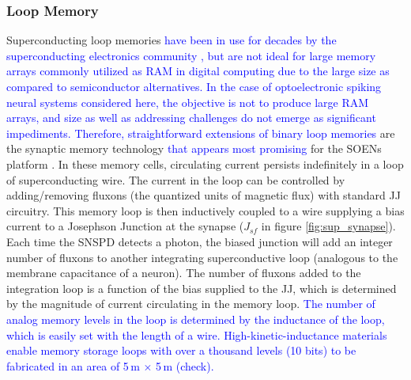 \documentclass[twocolumn]{article}
\begin{document}
\subsubsection{Loop Memory}\label{Loops}
Superconducting loop memories \textcolor{blue}{have been in use for decades by the superconducting electronics community \cite{vatu1998,ka1999}, but are not ideal for large memory arrays commonly utilized as RAM in digital computing due to the large size as compared to semiconductor alternatives. In the case of optoelectronic spiking neural systems considered here, the objective is not to produce large RAM arrays, and size as well as addressing challenges do not emerge as significant impediments. Therefore, straightforward extensions of binary loop memories} are the synaptic memory technology \textcolor{blue}{that appears most promising} for the SOENs platform \cite{sh2018,shainline2019superconducting}. In these memory cells, circulating current persists indefinitely in a loop of superconducting wire. The current in the loop can be controlled by adding/removing fluxons (the quantized units of magnetic flux) with standard JJ circuitry. This memory loop is then inductively coupled to a wire supplying a bias current to a Josephson Junction at the synapse ($J_{sf}$ in figure \ref{fig:sup_synapse}). Each time the SNSPD detects a photon, the biased junction will add an integer number of fluxons to another integrating superconductive loop (analogous to the membrane capacitance of a neuron). The number of fluxons added to the integration loop is a function of the bias supplied to the JJ, which is determined by the magnitude of current circulating in the memory loop. \textcolor{blue}{The number of analog memory levels in the loop is determined by the inductance of the loop, which is easily set with the length of a wire. High-kinetic-inductance materials \cite{} enable memory storage loops with over a thousand levels (10 bits) to be fabricated in an area of 5\,\textmu m $\times$ 5\,\textmu m (check).}
\end{document}
